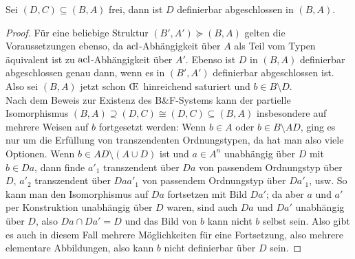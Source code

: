 \begin{lemma}\label{Freie Definierbarkeit}
	Sei $(D,C)\subseteq(B,A)$ frei, dann ist $D$ definierbar abgeschlossen in $(B,A)$.
\end{lemma}
\begin{proof}
	Für eine beliebige Struktur $(B',A')\succeq (B,A)$ gelten die Voraussetzungen ebenso, da $\operatorname{acl}$-Abhängigkeit über $A$ als Teil vom Typen äquivalent ist zu $\operatorname{acl}$-Abhängigkeit über $A'$. Ebenso ist $D$ in $(B,A)$ definierbar abgeschlossen genau dann, wenn es in $(B',A')$ definierbar abgeschlossen ist. Also sei $(B,A)$ jetzt schon \OE\ hinreichend saturiert und $b\in B\setminus D$.\\
	Nach dem Beweis zur Existenz des B\&F-Systems kann der partielle Isomorphismus $(B,A)\supseteq(D,C)\cong(D,C)\subseteq(B,A)$ insbesondere auf mehrere Weisen auf $b$ fortgesetzt werden: Wenn $b\in A$ oder $b\in B\setminus AD$, ging es nur um die Erfüllung von transzendenten Ordnungstypen, da hat man also viele Optionen. Wenn $b\in AD\setminus(A\cup D)$ ist und $a\in A^n$ unabhängig über $D$ mit $b\in Da$, dann finde $a'_1$ transzendent über $Da$ von passendem Ordnungstyp über $D$, $a'_2$ transzendent über $Daa'_1$ von passendem Ordnungstyp über $Da'_1$, usw. So kann man den Isomorphismus auf $Da$ fortsetzen mit Bild $Da'$; da aber $a$ und $a'$ per Konstruktion unabhängig über $D$ waren, sind auch $Da$ und $Da'$ unabhängig über $D$, also $Da\cap Da'=D$ und das Bild von $b$ kann nicht $b$ selbst sein. Also gibt es auch in diesem Fall mehrere Möglichkeiten für eine Fortsetzung, also mehrere elementare Abbildungen, also kann $b$ nicht definierbar über $D$ sein.
\end{proof}


